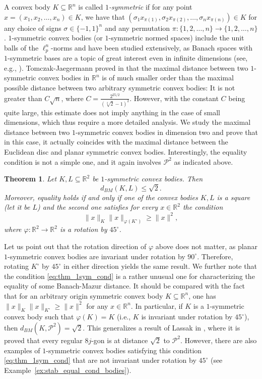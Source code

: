 \documentclass[12pt,a4paper]{article}
\newtheorem{twr}{Theorem}[section]
\theoremstyle{definition}
\newcommand\R{\mathbb{R}}
\newcommand\CP{\mathcal{P}}
\newcommand\cemph[1]{\emph{\color{red}#1}}
\begin{document}
A convex body $K \subseteq \R^n$ is called \cemph{$1$-symmetric} if for any point $x=(x_1, x_2, \ldots, x_n) \in K$, we have that $(\sigma_1 x_{\pi(1)}, \sigma_2 x_{\pi(2)}, \ldots, \sigma_n x_{\pi(n)}) \in K$ for any choice of signs $\sigma \in \{-1, 1\}^n$ and any permutation $\pi: \{1, 2, \ldots, n\} \to \{1, 2, \ldots, n\}$. $1$-symmetric convex bodies (or $1$-symmetric normed spaces) include the unit balls of the $\ell^n_p$-norms and have been studied extensively, as Banach spaces with $1$-symmetric bases are a topic of great interest even in infinite dimensions (see, e.g., \cite{tomczak}). Tomczak-Jaegermann proved in \cite{tomczaksymm} that the maximal distance between two $1$-symmetric convex bodies in $\R^n$ is of much smaller order than the maximal possible distance between two arbitrary symmetric convex bodies: It is not greater than $C \sqrt{n}$, where $C = \frac{2^{25/2}}{(\sqrt[4]{2}-1)^2}$. However, with the constant $C$ being quite large, this estimate does not imply anything in the case of small dimensions, which thus require a more detailed analysis. We study the maximal distance between two $1$-symmetric convex bodies in dimension two and prove that in this case, it actually coincides with the maximal distance between the Euclidean disc and planar symmetric convex bodies. Interestingly, the equality condition is not a simple one, and it again involves $\CP^2$ as indicated above.



\begin{twr}
\label{thm:1sym}
Let $K, L \subseteq \R^2$ be $1$-symmetric convex bodies. Then
$$d_{BM}(K, L) \leq \sqrt{2}.$$
Moreover, equality holds if and only if one of the convex bodies $K, L$ is a square (let it be $L$) and the second one satisfies for every $x \in \R^2$ the condition
\begin{equation}
\label{eq:thm_1sym_cond}
\|x \|_K \| x \|_{\varphi(K^\circ)} \geq \| x\|^2,
\end{equation}
where $\varphi \colon \R^2 \to \R^2$ is a rotation by $45^\circ$.
\end{twr}



Let us point out that the rotation direction of $\varphi$ above does not matter, as planar $1$-symmetric convex bodies are invariant under rotation by $90^\circ$. Therefore, rotating $K^\circ$ by $45^\circ$ in either direction yields the same result. We further note that the condition \eqref{eq:thm_1sym_cond} is a rather unusual one for characterizing the equality of some Banach-Mazur distance. It should be compared with the fact that for an arbitrary origin symmetric convex body $K \subseteq \R^n$, one has $\|x \|_K \| x \|_{K^\circ} \geq \| x\|^2$ for any $x \in \R^n$. In particular, if $K$ is a $1$-symmetric convex body such that $\varphi(K)=K$ (i.e., $K$ is invariant under rotation by $45^\circ$), then $d_{BM}(K, \CP^2)=\sqrt{2}$. This generalizes a result of Lassak in \cite{lassak}, where it is proved that every regular $8j$-gon is at distance $\sqrt{2}$ to $\CP^2$. However, there are also examples of $1$-symmetric convex bodies satisfying this condition \eqref{eq:thm_1sym_cond} that are not invariant under rotation by $45^\circ$ (see Example~\ref{ex:stab_equal_cond_bodies}).
\end{document}
